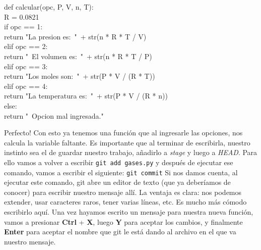 \documentclass[10pt,letterpaper]{article}
\newcommand{\inlinecode}[1]{
\colorbox{light-gray}{\texttt{#1}}
}
\newenvironment{Code}
{
\begin{lrbox}{\selvestebox}%
\begin{minipage}{\dimexpr\columnwidth-2\fboxsep\relax}
\fontfamily{\ttdefault}\selectfont
}
{\end{minipage}\end{lrbox}%
\begin{center}
\colorbox{light-gray}{\usebox{\selvestebox}}
\end{center}
}
\begin{document}
\begin{Code}
def calcular(opc, P, V, n, T):\\
\hspace*{8mm}R = 0.0821\\
\hspace*{8mm}if opc == 1:\\
\hspace*{16mm}return "La presion es:\ "\ + str(n * R * T / V)\\
\hspace*{8mm}elif opc == 2:\\
\hspace*{16mm}return "\ \hspace*{-1.5mm}El volumen es:\ "\ + str(n * R * T / P)\\
\hspace*{8mm}elif opc == 3:\\
\hspace*{16mm}return "Los moles son:\ "\ + str(P * V / (R * T))\\
\hspace*{8mm}elif opc == 4:\\
\hspace*{16mm}return "La temperatura es:\ "\ + str(P * V / (R * n))\\
\hspace*{8mm}else:\\
\hspace*{16mm}return "\ \hspace*{-1.5mm}Opcion mal ingresada."
\end{Code}

Perfecto! Con esto ya tenemos una funci\'on que al ingresarle las opciones, nos calcula la variable faltante. Es importante que al terminar de escribirla, nuestro instinto sea el de guardar nuestro trabajo, a\~nadirlo a \textit{stage} y luego a \textit{HEAD}. Para ello vamos a volver a escribir \inlinecode{git add gases.py} y despu\'es de ejecutar ese comando, vamos a escribir el siguiente: \inlinecode{git commit} Si nos damos cuenta, al ejecutar este comando, git abre un editor de texto (que ya deber\'iamos de conocer) para escribir nuestro mensaje all\'i. La ventaja es clara: nos podemos extender, usar caracteres raros, tener varias l\'ineas, etc. Es mucho m\'as c\'omodo escribirlo aqu\'i. Una vez hayamos escrito un mensaje para nuestra nueva funci\'on, vamos a presionar \textbf{Ctrl} + \textbf{X}, luego \textbf{Y} para aceptar los cambios, y finalmente \textbf{Enter} para aceptar el nombre que git le est\'a dando al archivo en el que va nuestro mensaje.\\
\end{document}
